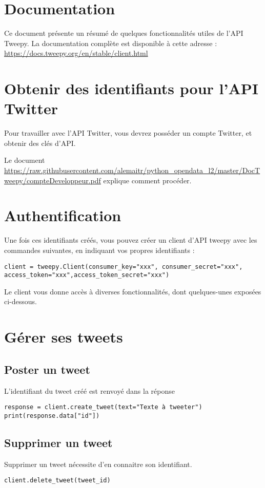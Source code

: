\documentclass[11pt,a4paper]{article}
\begin{document}
\section*{Documentation}
Ce document présente un résumé de quelques fonctionnalités utiles de l'API Tweepy. La documentation complète est disponible à cette adresse : \url{https://docs.tweepy.org/en/stable/client.html}

\section{Obtenir des identifiants pour l'API Twitter}
Pour travailler avec l’API Twitter, vous devrez posséder un compte Twitter, et obtenir des clés d'API.

Le document \url{https://raw.githubusercontent.com/alemaitr/python_opendata_l2/master/DocTweepy/compteDeveloppeur.pdf} explique comment procéder. 

\section{Authentification}
Une fois ces identifiants créés, vous pouvez créer un client d'API tweepy avec les commandes suivantes, en indiquant vos propres identifiants  :
\begin{lstlisting}
client = tweepy.Client(consumer_key="xxx", consumer_secret="xxx", access_token="xxx",access_token_secret="xxx")
\end{lstlisting}
Le client vous donne accès à diverses fonctionnalités, dont quelques-unes  exposées ci-dessous. 
\section{Gérer ses tweets}
\subsection{Poster un tweet}

L'identifiant du tweet créé est renvoyé dans la réponse
\begin{lstlisting}
response = client.create_tweet(text="Texte à tweeter")
print(response.data["id"])
\end{lstlisting}

\subsection{Supprimer un tweet}
Supprimer un tweet nécessite d'en connaitre son identifiant. 
\begin{lstlisting}
client.delete_tweet(tweet_id)
\end{lstlisting}
\end{document}
